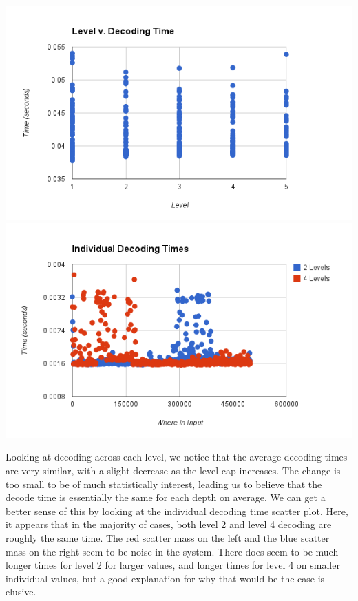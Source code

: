 \documentclass{article}
\begin{document}
\includegraphics[scale=0.4]{images/betterlevel_v_decode}
\includegraphics[scale=0.4]{images/individual_decodetime}
\afterpage{\vfill}

Looking at decoding across each level, we notice that the average decoding times are very similar, with a slight decrease as the level cap increases. The change is too small to be of much statistically interest, leading us to believe that the decode time is essentially the same for each depth on average. We can get a better sense of this by looking at the individual decoding time scatter plot. Here, it appears that in the majority of cases, both level 2 and level 4 decoding are roughly the same time. The red scatter mass on the left and the blue scatter mass on the right seem to be noise in the system. There does seem to be much longer times for level 2 for larger values, and longer times for level 4 on smaller individual values, but a good explanation for why that would be the case is elusive.\\
\end{document}
